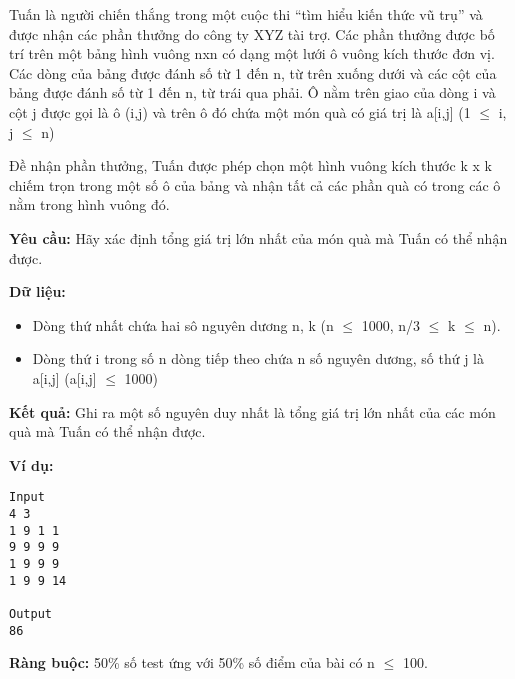 

Tuấn là người chiến thắng trong một cuộc thi “tìm hiểu kiến thức vũ trụ” và được nhận các phần thưởng do công ty XYZ tài trợ. Các phần thưởng được bố trí trên một bảng hình vuông nxn  có dạng một lưới ô vuông kích thước đơn vị. Các dòng của bảng được đánh số từ 1 đến n, từ trên xuống dưới và các cột của bảng được đánh số từ 1 đến n, từ trái qua phải. Ô nằm trên giao của dòng i và cột j được gọi là ô (i,j) và trên ô đó chứa một món quà có giá trị là a[i,j] (1  $\le$  i, j  $\le$  n)

Đề nhận phần thưởng, Tuấn được phép chọn một hình vuông kích thước k x k chiếm trọn trong một số ô của bảng và nhận tất cả các phần quà có trong các ô nằm trong hình vuông đó.

\textbf{Yêu cầu: } Hãy xác định tổng giá trị lớn nhất của món quà mà Tuấn có thể nhận được.

\textbf{Dữ liệu: }
\begin{itemize}
	\item Dòng thứ nhất chứa hai sô nguyên dương n, k (n  $\le$  1000, n/3  $\le$  k  $\le$  n).
	\item Dòng thứ i trong số n dòng tiếp theo chứa n số nguyên dương, số thứ j là a[i,j] (a[i,j]  $\le$  1000)
\end{itemize}

\textbf{Kết quả: } Ghi ra một số nguyên duy nhất là tổng giá trị lớn nhất của các món quà mà Tuấn có thể nhận được.

\textbf{Ví dụ: }
\begin{verbatim}
Input
4 3
1 9 1 1
9 9 9 9
1 9 9 9
1 9 9 14

Output
86\end{verbatim}

\textbf{Ràng buộc: } 50\% số test ứng với 50\% số điểm của bài có n  $\le$  100.

